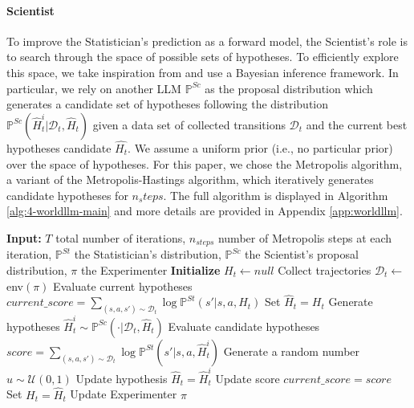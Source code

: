 \documentclass{article}
\begin{document}
\paragraph{Scientist}
To improve the Statistician's prediction as a forward model, the Scientist's role is to search through the space of possible sets of hypotheses. To efficiently explore this space, we take inspiration from \citep{wang_hypothesis_2023,piriyakulkij_doing_2024} and use a Bayesian inference framework. In particular, we rely on another LLM $\mathbb{P}^{Sc}$ as the proposal distribution which generates a candidate set of hypotheses following the distribution $\mathbb{P}^{Sc}(\hat{H}_t^i|\mathcal{D}_t,\hat{H}_t)$ given a data set of collected transitions $\mathcal{D}_t$ and the current best hypotheses candidate $\hat{H_t}$. We assume a uniform prior (i.e., no particular prior) over the space of hypotheses. For this paper, we chose the Metropolis algorithm, a variant of the Metropolis-Hastings algorithm, which iteratively generates candidate hypotheses for $n_steps$. The full algorithm is displayed in Algorithm \ref{alg:4-worldllm-main} and more details are provided in Appendix \ref{app:worldllm}. 

\begin{algorithm}
\caption{WorldLLM}
\begin{algorithmic}[1]
\State \textbf{Input:} $T$ total number of iterations, $n_{steps}$ number of Metropolis steps at each iteration, $\mathbb{P}^{St}$ the Statistician's distribution, $\mathbb{P}^{Sc}$ the Scientist's proposal distribution, $\pi$ the Experimenter
\State \textbf{Initialize} $H_t \leftarrow null$ 
    \State Collect trajectories $\mathcal{D}_t \leftarrow$env$(\pi)$
    \State Evaluate current hypotheses $current\_score = \sum\limits_{(s,a,s')\sim \mathcal{D}_t}\log\mathbb{P}^{St}(s'|s,a, H_t)$ 
    \State Set $\hat{H}_t = H_t$
    \State Generate hypotheses $\hat{H}_t^i \sim\mathbb{P}^{Sc}(\cdot|\mathcal{D}_t,\hat{H}_t)$
    \State Evaluate candidate hypotheses $score = \sum\limits_{(s,a,s')\sim \mathcal{D}_t} \log\mathbb{P}^{St}(s'|s,a, \hat{H}_t^i)$
    \State Generate a random number $u \sim \mathcal{U}(0,1)$ 
     
    \State Update hypothesis $\hat{H}_t = \hat{H}_t^i$
    \State Update score $current\_score = score$
    \EndIf
    \EndFor
    \State Set $H_t = \hat{H}_t$
    \State Update Experimenter $\pi$ 
\EndFor
\end{algorithmic}
\label{alg:4-worldllm-main}
\end{algorithm}
\end{document}
